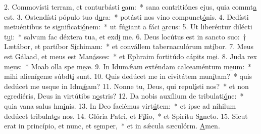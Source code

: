 2. Commovísti terram, et conturbásti \uline{e}am:~* sana contritiónes ejus, quia commt\uline{a} est.
3. Ostendísti pópulo tuo d\uline{u}ra:~* potásti nos vino compunct\uline{ó}nis.
4. Dedísti metuéntibus te significati\uline{ó}nem:~* ut fúgiant a fáci \uline{a}rcus:
5. Ut liberéntur dilécti t\uline{u}i:~* salvum fac déxtera tua, et exd\uline{i} me.
6. Deus locútus est in sancto suo:~† Lætábor, et partíbor S\uline{í}chimam:~* et convállem tabernaculórum mt\uline{í}bor.
7. Meus est Gálaad, et meus est Man\uline{á}sses:~* et Ephraim fortitúdo cápits m\uline{e}i.
8. Juda rex m\uline{e}us:~* Moab olla spe m\uline{e}æ.
9. In Idumǽam exténdam calceaméntum m\uline{e}um:~* mihi alienígenæ súbdt\uline{i} sunt.
10. Quis dedúcet me in civitátem mun\uline{í}tam?~* quis dedúcet me usque in Idm\uline{ǽ}am?
11. Nonne tu, Deus, qui repul\uline{í}sti nos?~* et non egrediéris, Deus in virtútibs n\uline{o}stris?
12. Da nobis auxílium de tribulati\uline{ó}ne:~* quia vana salus hm\uline{i}nis.
13. In Deo faciémus virt\uline{ú}tem:~* et ipse ad níhilum dedúcet tribulnt\uline{e}s nos.
14. Glória Patri, et F\uline{í}lio,~* et Spirítu S\uline{a}ncto.
15. Sicut erat in princípio, et nunc, et s\uline{e}mper,~* et in sǽcula sæculórm. \uline{A}men.

